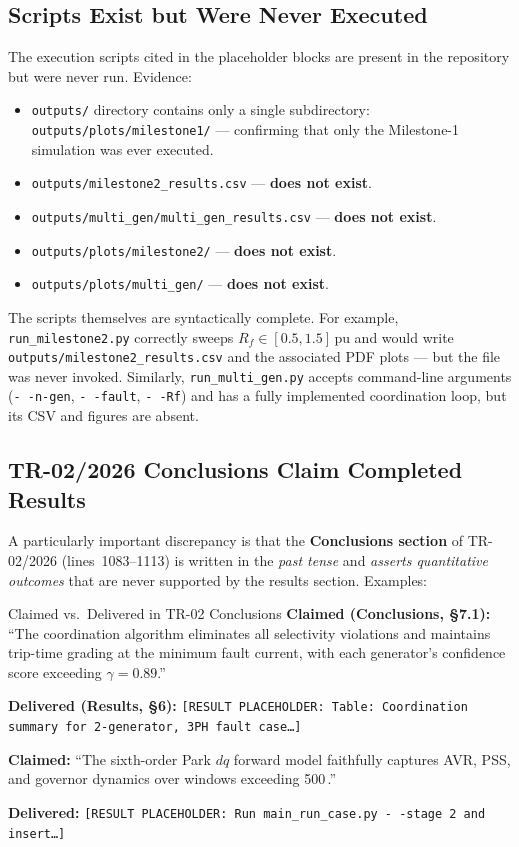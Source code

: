 \documentclass[12pt,a4paper]{article}
\newcommand{\pu}{\,\text{pu}}
\newcommand{\mss}{\,\text{ms}}
\begin{document}
\subsection{Scripts Exist but Were Never Executed}
\label{sec:ev:scripts}

The execution scripts cited in the placeholder blocks are present in the
repository but were never run.  Evidence:

\begin{itemize}
  \item \texttt{outputs/} directory contains only a single subdirectory:
        \texttt{outputs/plots/milestone1/} — confirming that only the Milestone-1
        simulation was ever executed.
  \item \texttt{outputs/milestone2\_results.csv} — \textbf{does not exist}.
  \item \texttt{outputs/multi\_gen/multi\_gen\_results.csv} — \textbf{does not exist}.
  \item \texttt{outputs/plots/milestone2/} — \textbf{does not exist}.
  \item \texttt{outputs/plots/multi\_gen/} — \textbf{does not exist}.
\end{itemize}

The scripts themselves are syntactically complete.  For example,
\texttt{run\_milestone2.py} correctly sweeps $R_f \in [0.5, 1.5]\pu$ and would
write \texttt{outputs/milestone2\_results.csv} and the associated PDF plots
--- but the file was never invoked.  Similarly, \texttt{run\_multi\_gen.py}
accepts command-line arguments (\texttt{-\,-n-gen}, \texttt{-\,-fault},
\texttt{-\,-Rf}) and has a fully implemented coordination loop, but its CSV
and figures are absent.

\subsection{TR-02/2026 Conclusions Claim Completed Results}
\label{sec:ev:conclusions}

A particularly important discrepancy is that the \textbf{Conclusions section}
of TR-02/2026 (lines~1083--1113) is written in the \emph{past tense} and
\emph{asserts quantitative outcomes} that are never supported by the results
section.  Examples:

\begin{findingbox}{Claimed vs.\ Delivered in TR-02 Conclusions}
\textbf{Claimed (Conclusions, \S7.1):}
``The coordination algorithm eliminates all selectivity violations and maintains
trip-time grading at the minimum fault current, with each generator's confidence
score exceeding $\gamma = 0.89$.''

\textbf{Delivered (Results, \S6):}
\texttt{[RESULT PLACEHOLDER: Table: Coordination summary for 2-generator, 3PH fault case\ldots]}

\medskip
\textbf{Claimed:}
``The sixth-order Park $dq$ forward model faithfully captures AVR, PSS, and governor
dynamics over windows exceeding 500\mss.''

\textbf{Delivered:}
\texttt{[RESULT PLACEHOLDER: Run main\_run\_case.py \texttt{-\,-}stage 2 and insert\ldots]}
\end{findingbox}
\end{document}
